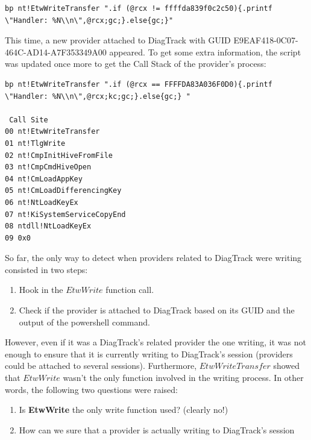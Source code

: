 \begin{lstlisting}
bp nt!EtwWriteTransfer ".if (@rcx != ffffda839f0c2c50){.printf \"Handler: %N\\n\",@rcx;gc;}.else{gc;}"
\end{lstlisting}

This time, a new provider attached to DiagTrack with GUID E9EAF418-0C07-464C-AD14-A7F353349A00 appeared. To get some extra information, the script was updated once more to get the Call Stack of the provider's process:
\begin{lstlisting}
bp nt!EtwWriteTransfer ".if (@rcx == FFFFDA83A036F0D0){.printf \"Handler: %N\\n\",@rcx;kc;gc;}.else{gc;} "
 
 Call Site
00 nt!EtwWriteTransfer
01 nt!TlgWrite
02 nt!CmpInitHiveFromFile
03 nt!CmpCmdHiveOpen
04 nt!CmLoadAppKey
05 nt!CmLoadDifferencingKey
06 nt!NtLoadKeyEx
07 nt!KiSystemServiceCopyEnd
08 ntdll!NtLoadKeyEx
09 0x0
\end{lstlisting}

So far, the only way to detect when providers related to DiagTrack were writing consisted in two steps: 

\begin{enumerate}
\setlength\itemsep{0.05em}
\item Hook in the $EtwWrite$ function call.
\item Check if the provider is attached to DiagTrack based on its GUID and the output of the powershell command.
\end{enumerate}

However, even if it was a DiagTrack's related provider the one writing, it was not enough to ensure that it is currently writing to DiagTrack's session (providers could be attached to several sessions). Furthermore, $EtwWriteTransfer$ showed that $EtwWrite$ wasn't the only function involved in the writing process. In other words, the following two questions were raised:

\begin{enumerate}
\setlength\itemsep{0.05em}
  \item Is {\bfseries EtwWrite} the only write function used? (clearly no!)
  \item How can we sure that a provider is actually writing to DiagTrack's session
\end{enumerate}



